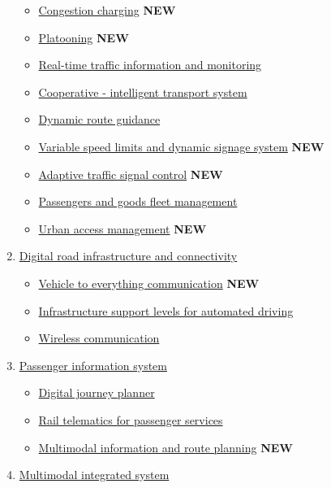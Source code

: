 \documentclass[
]{book}
\providecommand{\tightlist}{%
  \setlength{\itemsep}{0pt}\setlength{\parskip}{0pt}}
\begin{document}
\begin{enumerate}
  \begin{itemize}
  \tightlist
  \item
    \protect\hyperlink{congestion_charging}{Congestion charging} \textbf{NEW}
  \item
    \protect\hyperlink{platooning}{Platooning} \textbf{NEW}
  \item
    \protect\hyperlink{traffic_info_monitoring}{Real-time traffic information and monitoring}
  \item
    \protect\hyperlink{cits}{Cooperative - intelligent transport system}
  \item
    \protect\hyperlink{dynamic_route}{Dynamic route guidance}
  \item
    \protect\hyperlink{variable_speed}{Variable speed limits and dynamic signage system} \textbf{NEW}
  \item
    \protect\hyperlink{adaptive_traffic_control}{Adaptive traffic signal control} \textbf{NEW}
  \item
    \protect\hyperlink{p_g_fleet_management}{Passengers and goods fleet management}
  \item
    \protect\hyperlink{urban_access}{Urban access management} \textbf{NEW}
  \end{itemize}
\item
  \protect\hyperlink{digital}{Digital road infrastructure and connectivity}

  \begin{itemize}
  \tightlist
  \item
    \protect\hyperlink{v2x}{Vehicle to everything communication} \textbf{NEW}
  \item
    \protect\hyperlink{infrast_support_level}{Infrastructure support levels for automated driving}
  \item
    \protect\hyperlink{wireless_com}{Wireless communication}
  \end{itemize}
\item
  \protect\hyperlink{passenger}{Passenger information system}

  \begin{itemize}
  \tightlist
  \item
    \protect\hyperlink{djp}{Digital journey planner}
  \item
    \protect\hyperlink{telematics_passenger}{Rail telematics for passenger services}
  \item
    \protect\hyperlink{info_and_route_planning}{Multimodal information and route planning} \textbf{NEW}
  \end{itemize}
\item
  \protect\hyperlink{multimodal}{Multimodal integrated system}


\end{enumerate}
\end{document}
